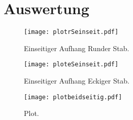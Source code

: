 \section{Auswertung}
\label{sec:Auswertung}

\begin{figure}
  \centering
  \texttt{[image: plotrSeinseit.pdf]}
  \caption{Einseitiger Aufhang Runder Stab.}
  \label{fig:plotrSeinseit}
\end{figure}

\begin{figure}
  \centering
  \texttt{[image: ploteSeinseit.pdf]}
  \caption{Einseitiger Aufhang Eckiger Stab.}
  \label{fig:ploteSeinseit}
\end{figure}

\begin{figure}
  \centering
  \texttt{[image: plotbeidseitig.pdf]}
  \caption{Plot.}
  \label{fig:plotbeidseitig}
\end{figure}



